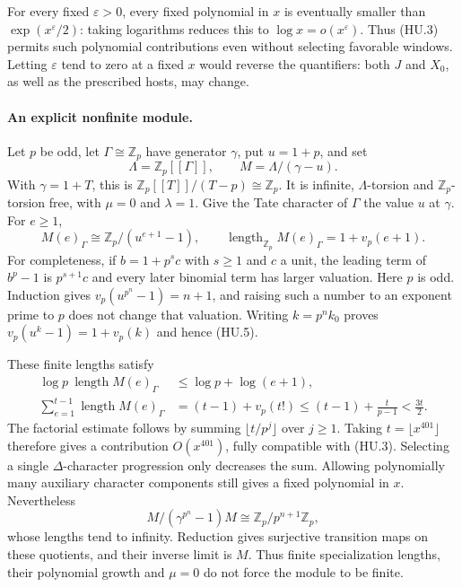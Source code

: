 \documentclass[11pt,a4paper]{article}
\theoremstyle{definition}
\begin{document}
For every fixed $\varepsilon>0$, every fixed polynomial in $x$
is eventually smaller than $\exp(x^\varepsilon/2)$: taking
logarithms reduces this to $\log x=o(x^\varepsilon)$.
Thus (HU.3) permits such polynomial contributions even without
selecting favorable windows.  Letting $\varepsilon$ tend to zero
at a fixed $x$ would reverse the quantifiers: both $J$ and $X_0$,
as well as the prescribed hosts, may change.

\paragraph{An explicit nonfinite module.}
Let $p$ be odd, let $\Gamma\cong\mathbb Z_p$ have generator $\gamma$,
put $u=1+p$, and set
\[
 \Lambda=\mathbb Z_p[[\Gamma]],\qquad
 M=\Lambda/(\gamma-u).
 \tag{HU.4}
\]
With $\gamma=1+T$, this is
$\mathbb Z_p[[T]]/(T-p)\cong\mathbb Z_p$.
It is infinite, $\Lambda$-torsion and $\mathbb Z_p$-torsion free,
with $\mu=0$ and $\lambda=1$.
Give the Tate character of $\Gamma$ the value $u$ at $\gamma$.
For $e\ge1$,
\[
 M(e)_\Gamma\cong
       \mathbb Z_p/(u^{e+1}-1),\qquad
 \operatorname{length}_{\mathbb Z_p}M(e)_\Gamma
       =1+v_p(e+1).
 \tag{HU.5}
\]
For completeness, if $b=1+p^s c$ with $s\ge1$ and $c$ a unit,
the leading term of $b^p-1$ is $p^{s+1}c$ and every later
binomial term has larger valuation.  Here $p$ is odd.
Induction gives $v_p(u^{p^n}-1)=n+1$, and raising such a number
to an exponent prime to $p$ does not change that valuation.
Writing $k=p^nk_0$ proves
$v_p(u^k-1)=1+v_p(k)$ and hence (HU.5).

These finite lengths satisfy
\[
 \begin{split}
 \log p\ \operatorname{length}M(e)_\Gamma
     &\le \log p+\log(e+1),\\
 \sum_{e=1}^{t-1}\operatorname{length}M(e)_\Gamma
     &=(t-1)+v_p(t!)
       \le (t-1)+\frac{t}{p-1}<\frac{3t}{2}.
 \end{split}
 \tag{HU.6}
\]
The factorial estimate follows by summing
$\lfloor t/p^j\rfloor$ over $j\ge1$.
Taking $t=\lfloor x^{401}\rfloor$ therefore gives a contribution
$O(x^{401})$, fully compatible with (HU.3).
Selecting a single $\Delta$-character progression only decreases
the sum.  Allowing polynomially many auxiliary character components
still gives a fixed polynomial in $x$.
Nevertheless
\[
 M/(\gamma^{p^n}-1)M\cong\mathbb Z_p/p^{n+1}\mathbb Z_p,
 \tag{HU.7}
\]
whose lengths tend to infinity.  Reduction gives surjective
transition maps on these quotients, and their inverse limit is $M$.
Thus finite specialization lengths, their polynomial growth and
$\mu=0$ do not force the module to be finite.
\end{document}
